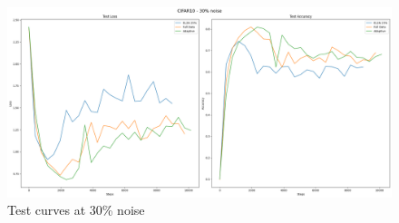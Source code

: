 \documentclass{article}
\begin{document}
\begin{figure}[h]
    \centering
    \includegraphics[width=1\textwidth]{output_noise_30.png}
    \caption{Test curves at 30\% noise}
    \label{fig:output_30}
\end{figure}
\end{document}

